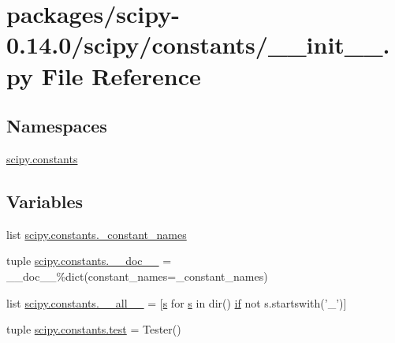 \hypertarget{packages_2scipy-0_814_80_2scipy_2constants_2____init_____8py}{}\section{packages/scipy-\/0.14.0/scipy/constants/\+\_\+\+\_\+init\+\_\+\+\_\+.py File Reference}
\label{packages_2scipy-0_814_80_2scipy_2constants_2____init_____8py}
\subsection*{Namespaces}
\begin{DoxyCompactItemize}
\item 
 \hyperlink{namespacescipy_1_1constants}{scipy.\+constants}
\end{DoxyCompactItemize}
\subsection*{Variables}
\begin{DoxyCompactItemize}
\item 
list \hyperlink{namespacescipy_1_1constants_a391f23b56d1f395ddc55cdf4745095ff}{scipy.\+constants.\+\_\+constant\+\_\+names}
\item 
tuple \hyperlink{namespacescipy_1_1constants_a083edbab749523d0373c761fed026093}{scipy.\+constants.\+\_\+\+\_\+doc\+\_\+\+\_\+} = \+\_\+\+\_\+doc\+\_\+\+\_\+\%dict(constant\+\_\+names=\+\_\+constant\+\_\+names)
\item 
list \hyperlink{namespacescipy_1_1constants_aab236098483b3e189f4aada95bd3084f}{scipy.\+constants.\+\_\+\+\_\+all\+\_\+\+\_\+} = \mbox{[}\hyperlink{indexexpr_8h_ae024b0db549122b44c349ae28ec990dc}{s} for \hyperlink{indexexpr_8h_ae024b0db549122b44c349ae28ec990dc}{s} in dir() \hyperlink{minmax_8h_a30a0ee9fee303f01d9c5e6f669e0dfe9}{if} not s.\+startswith('\+\_\+')\mbox{]}
\item 
tuple \hyperlink{namespacescipy_1_1constants_aa90d5edfe1580bda302530bfb9b60081}{scipy.\+constants.\+test} = Tester()
\end{DoxyCompactItemize}
